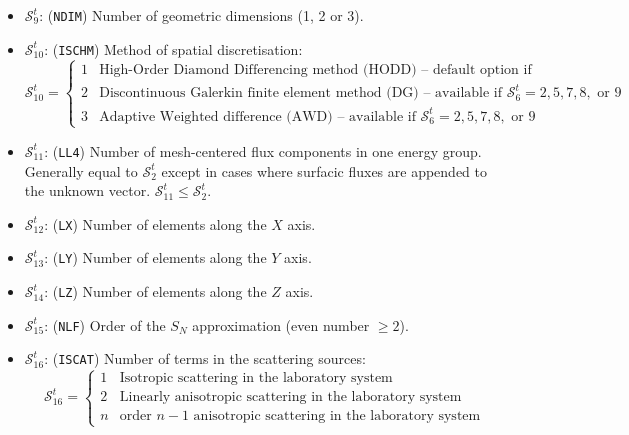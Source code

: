 \begin{itemize}
\item $\mathcal{S}^{t}_{9}$: ({\tt NDIM}) Number of geometric dimensions (1, 2 or 3).

\item $\mathcal{S}^{t}_{10}$: ({\tt ISCHM}) Method of spatial discretisation:
\begin{displaymath}
\mathcal{S}^{t}_{10} = \left\{
\begin{array}{rl}
 1 & \textrm{High-Order Diamond Differencing method (HODD) -- default option if unspecified} \\
 2 & \textrm{Discontinuous Galerkin finite element method (DG) -- available if $\mathcal{S}^{t}_{6} = 2, 5, 7, 8,$ or $9$}\\
 3 & \textrm{Adaptive Weighted difference (AWD) -- available if $\mathcal{S}^{t}_{6} = 2, 5, 7, 8,$ or $9$}
\end{array} \right.
\end{displaymath}

\item $\mathcal{S}^{t}_{11}$: ({\tt LL4}) Number of mesh-centered flux components in one energy group.
Generally equal to
$\mathcal{S}^{t}_{2}$ except in cases where surfacic fluxes are appended to the
unknown vector. $\mathcal{S}^{t}_{11}\le\mathcal{S}^{t}_{2}$.

\item $\mathcal{S}^{t}_{12}$: ({\tt LX}) Number of elements along the $X$ axis.

\item $\mathcal{S}^{t}_{13}$: ({\tt LY}) Number of elements along the $Y$ axis.

\item $\mathcal{S}^{t}_{14}$: ({\tt LZ}) Number of elements along the $Z$ axis.

\item $\mathcal{S}^{t}_{15}$: ({\tt NLF}) Order of the $S_N$ approximation (even number $\ge 2$).

\item $\mathcal{S}^{t}_{16}$: ({\tt ISCAT}) Number of terms in the scattering sources:
\begin{displaymath}
\mathcal{S}^{t}_{16} = \left\{
\begin{array}{rl}
 1 & \textrm{Isotropic scattering in the laboratory system} \\
 2 & \textrm{Linearly anisotropic scattering in the laboratory system} \\
 n & \textrm{order $n-1$ anisotropic scattering in the laboratory system}
\end{array} \right.
\end{displaymath}


\end{itemize}
